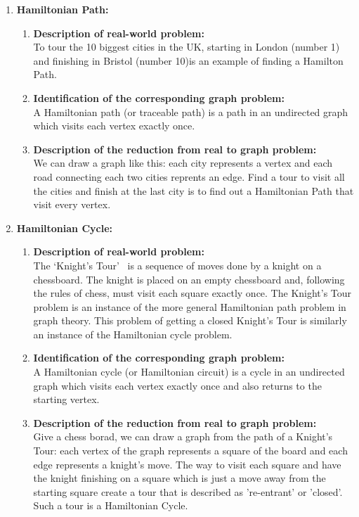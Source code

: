 \documentclass[article, 10pt,onecolumn]{article}
\begin{document}
\begin{enumerate}
\item \textbf{Hamiltonian Path:} 
\begin{enumerate}
	\item \textbf{Description of real-world problem:}\\
    To tour the 10 biggest cities in the UK, starting in London (number 1) and finishing in Bristol (number 10)is an example of finding a
    Hamilton Path.~\cite{path}
   \item \textbf{Identification of the corresponding graph problem:}\\
    A Hamiltonian path (or traceable path) is a path in an undirected graph which visits each vertex exactly once. 
   \item \textbf{Description of the reduction from real to graph problem:}\\
   We can draw a graph like this: each city represents a vertex and each road connecting each two cities reprents an edge. Find a tour to visit all the cities and finish at the last city is to find out a Hamiltonian Path that visit every vertex.
 \end{enumerate}  
\item \textbf{Hamiltonian Cycle:} 
\begin{enumerate}
	\item  \textbf{Description of real-world problem:}\\
    The `Knight's Tour'~\cite{knight} is a sequence of moves done by a knight on a chessboard. The knight is placed on an empty chessboard
    and, following the rules of chess, must visit each square exactly once. The Knight's Tour problem is an instance of the more general
    Hamiltonian path problem in graph theory. This problem of getting a closed Knight's Tour is similarly an instance of the Hamiltonian
    cycle problem.
   \item \textbf{Identification of the corresponding graph problem:}\\
    A Hamiltonian cycle (or Hamiltonian circuit) is a cycle in an undirected graph which visits each vertex exactly once and also returns to the starting vertex.
   \item \textbf{Description of the reduction from real to graph problem:}\\
    Give a chess borad, we can draw a graph from the path of a Knight's Tour: each vertex of the graph represents a square of the board and each edge represents a knight's move. The way to visit each square and have the knight finishing on a square which is just a move away from the starting square create a tour that is described as 're-entrant' or 'closed'. Such a tour is a Hamiltonian Cycle.

\end{enumerate}
\end{enumerate}
\end{document}
